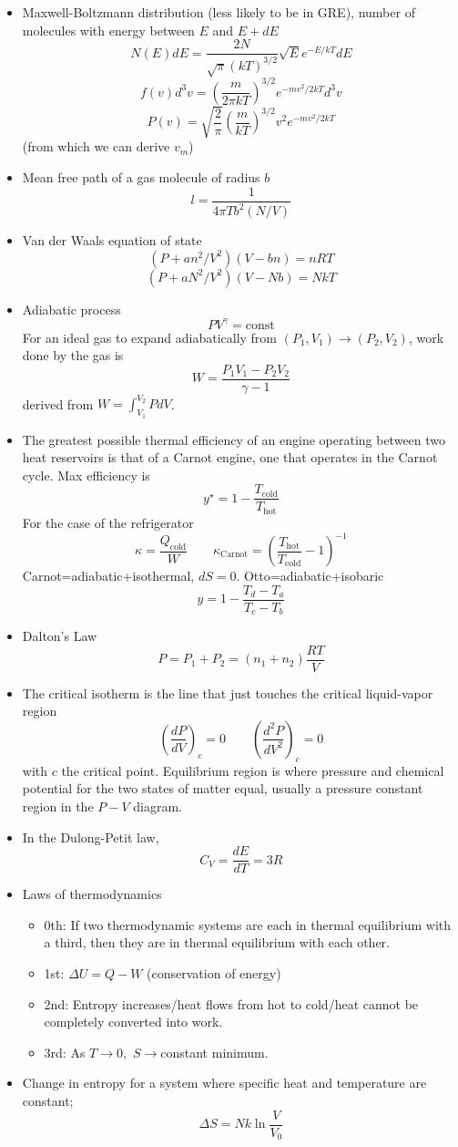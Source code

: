 \begin{itemize}
\item Maxwell-Boltzmann distribution (less likely to be in GRE), number
of molecules with energy between $E$ and $E+dE$\[
N(E)dE=\frac{2N}{\sqrt{\pi}(kT)^{3/2}}\sqrt{E}e^{-E/kT}dE\]
\[
f(v)d^{3}v=\left(\frac{m}{2\pi kT}\right)^{3/2}e^{-mv^{2}/2kT}d^{3}v\]
\[
P(v)=\sqrt{\frac{2}{\pi}}\left(\frac{m}{kT}\right)^{3/2}v^{2}e^{-mv^{2}/2kT}\]
(from which we can derive $v_{m}$)
\item Mean free path of a gas molecule of radius $b$\[
l=\frac{1}{4\pi Tb^{2}(N/V)}\]

\item Van der Waals equation of state\[
(P+an^{2}/V^{2})(V-bn)=nRT\]
\[
(P+aN^{2}/V^{2})(V-Nb)=NkT\]

\item Adiabatic process\[
PV^{\gamma}=\text{const}\]
For an ideal gas to expand adiabatically from $(P_{1},V_{1})\to(P_{2},V_{2})$,
work done by the gas is\[
W=\frac{P_{1}V_{1}-P_{2}V_{2}}{\gamma-1}\]
derived from $W=\int_{V_{1}}^{V_{2}}PdV$.
\item The greatest possible thermal efficiency of an engine operating between
two heat reservoirs is that of a Carnot engine, one that operates
in the Carnot cycle. Max efficiency is\[
y^{\star}=1-\frac{T_{\text{cold}}}{T_{\text{hot}}}\]
For the case of the refrigerator\[
\kappa=\frac{Q_{\text{cold}}}{W}\qquad\kappa_{\text{Carnot}}=\left(\frac{T_{\text{hot}}}{T_{\text{cold}}}-1\right)^{-1}\]
Carnot=adiabatic+isothermal, $dS=0$. Otto=adiabatic+isobaric\[
y=1-\frac{T_{d}-T_{a}}{T_{c}-T_{b}}\]

\item Dalton's Law\[
P=P_{1}+P_{2}=(n_{1}+n_{2})\frac{RT}{V}\]

\item The critical isotherm is the line that just touches the critical liquid-vapor
region\[
\left(\frac{dP}{dV}\right)_{c}=0\qquad\left(\frac{d^{2}P}{dV^{2}}\right)_{c}=0\]
with $c$ the critical point. Equilibrium region is where pressure
and chemical potential for the two states of matter equal, usually
a pressure constant region in the $P-V$ diagram.
\item In the Dulong-Petit law,\[
C_{V}=\frac{dE}{dT}=3R\]

\item Laws of thermodynamics

\begin{itemize}
\item 0th: If two thermodynamic systems are each in thermal equilibrium
with a third, then they are in thermal equilibrium with each other.
\item 1st: $\Delta U=Q-W$ (conservation of energy)
\item 2nd: Entropy increases/heat flows from hot to cold/heat cannot be
completely converted into work.
\item 3rd: As $T\to0,$ $S\to$constant minimum.
\end{itemize}
\item Change in entropy for a system where specific heat and temperature
are constant;\[
\Delta S=Nk\ln\frac{V}{V_{0}}\]


\end{itemize}

